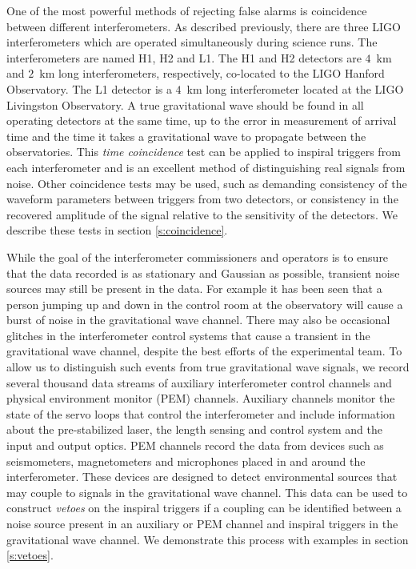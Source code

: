 One of the most powerful methods of rejecting false alarms is coincidence
between different interferometers. As described previously, there are three
LIGO interferometers which are operated simultaneously during science runs.
The interferometers are named H1, H2 and L1. The H1 and H2 detectors are
$4$~km and $2$~km long interferometers, respectively, co-located to the LIGO
Hanford Observatory. The L1 detector is a $4$~km long interferometer located
at the LIGO Livingston Observatory. A true gravitational wave should be found
in all operating detectors at the same time, up to the error in measurement of
arrival time and the time it takes a gravitational wave to propagate between
the observatories. This
\emph{time coincidence} test can be applied to inspiral triggers from each
interferometer and is an excellent method of distinguishing real signals from
noise. Other coincidence tests may be used, such as demanding consistency of
the waveform parameters between triggers from two detectors, or consistency in
the recovered amplitude of the signal relative to the sensitivity of the
detectors. We describe these tests in section \ref{s:coincidence}.

While the goal of the interferometer commissioners and operators is to ensure
that the data recorded is as stationary and Gaussian as possible, transient
noise sources may still be present in the data. For example it has been seen
that a person jumping up and down in the control room at the observatory will
cause a burst of noise in the gravitational wave channel. There may also be
occasional glitches in the interferometer control systems that cause a
transient in the gravitational wave channel, despite the best efforts of the
experimental team. To allow us to distinguish such events from true
gravitational wave signals, we record several thousand data streams of
auxiliary interferometer control channels and physical environment monitor
(PEM) channels. Auxiliary channels monitor the state of the servo loops that
control the interferometer and include information about the pre-stabilized
laser, the length sensing and control system and the input and output optics.
PEM channels record the data from devices such as seismometers, magnetometers
and microphones placed in and around the interferometer. These devices are
designed to detect environmental sources that may couple to signals in the
gravitational wave channel. This data can be used to construct \emph{vetoes}
on the inspiral triggers if a coupling can be identified between a noise
source present in an auxiliary or PEM channel and inspiral triggers in the
gravitational wave channel.  We demonstrate this process with examples in
section \ref{s:vetoes}. 

